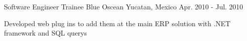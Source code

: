 \begin{cventries}

\cventry
{Software Engineer Trainee} %
{Blue Oscean} %
{Yucatan, Mexico} %
{Apr. 2010 - Jul. 2010} %
{ %
\begin{cvitems}
\item {Developed web plug ins to add them at the main ERP solution with .NET framework and SQL querys}
\end{cvitems}
}






\end{cventries}